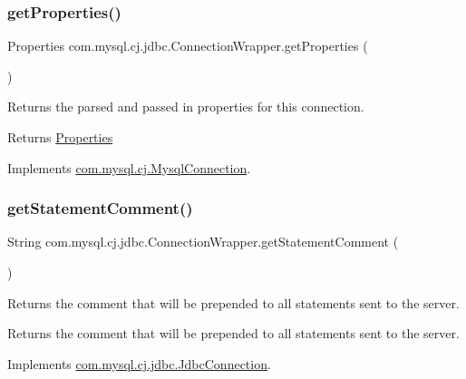 \subsubsection{\texorpdfstring{get\+Properties()}{getProperties()}}
{\footnotesize\ttfamily Properties com.\+mysql.\+cj.\+jdbc.\+Connection\+Wrapper.\+get\+Properties (\begin{DoxyParamCaption}{ }\end{DoxyParamCaption})}

Returns the parsed and passed in properties for this connection.

\begin{DoxyReturn}{Returns}
\mbox{\hyperlink{}{Properties}} 
\end{DoxyReturn}


Implements \mbox{\hyperlink{interfacecom_1_1mysql_1_1cj_1_1_mysql_connection_a1fde8714cc1e2176748fd4f35f0df0d1}{com.\+mysql.\+cj.\+Mysql\+Connection}}.

\mbox{\label{classcom_1_1mysql_1_1cj_1_1jdbc_1_1_connection_wrapper_a4fefdf8c3a3be123e8391959185cde40}} 
\subsubsection{\texorpdfstring{get\+Statement\+Comment()}{getStatementComment()}}
{\footnotesize\ttfamily String com.\+mysql.\+cj.\+jdbc.\+Connection\+Wrapper.\+get\+Statement\+Comment (\begin{DoxyParamCaption}{ }\end{DoxyParamCaption})}

Returns the comment that will be prepended to all statements sent to the server.

\begin{DoxyReturn}{Returns}
the comment that will be prepended to all statements sent to the server. 
\end{DoxyReturn}


Implements \mbox{\hyperlink{interfacecom_1_1mysql_1_1cj_1_1jdbc_1_1_jdbc_connection_a11233536b54479183feb8eda938f72e9}{com.\+mysql.\+cj.\+jdbc.\+Jdbc\+Connection}}.

